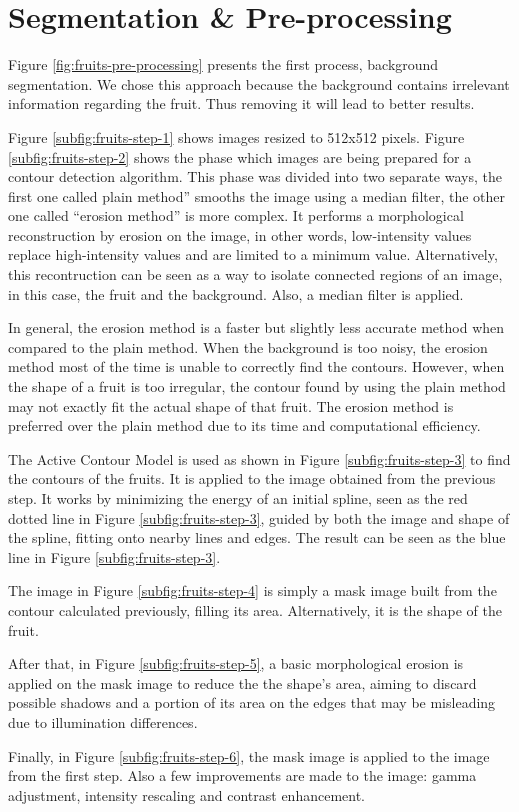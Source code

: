 \documentclass[../main.tex]{subfile}
\begin{document}
\section{Segmentation \& Pre-processing} \label{sec:segmentation-&-preprocesing}
    

    Figure \ref{fig:fruits-pre-processing} presents the first process, background segmentation. We chose this approach because the background contains irrelevant information regarding the fruit. Thus removing it will lead to better results.
    
    Figure \ref{subfig:fruits-step-1} shows images resized to 512x512 pixels. Figure \ref{subfig:fruits-step-2} shows the phase which  images are being prepared for a contour detection algorithm.
    This phase was divided into two separate ways, the first one called plain method'' smooths the image using a median filter, the other one called ``erosion method'' is more complex.
    It performs a morphological reconstruction by erosion on the image, in other words, low-intensity values replace high-intensity values and are limited to a minimum value. Alternatively, this recontruction can be seen as a way to isolate connected regions of an image, in this case, the fruit and the background. Also, a median filter is applied.
    
    In general, the erosion method is a faster but slightly less accurate method when compared to the plain method. When the background is too noisy, the erosion method most of the time is unable to correctly find the contours. However, when the shape of a fruit is too irregular, the contour found by using the plain method may not exactly fit the actual shape of that fruit. The erosion method is preferred over the plain method due to its time and computational efficiency.
    
    The Active Contour Model \cite{III-item1} is used as shown in Figure \ref{subfig:fruits-step-3} to find the contours of the fruits. It is applied to the image obtained from the previous step. It works by minimizing the energy of an initial spline, seen as the red dotted line in Figure \ref{subfig:fruits-step-3}, guided by both the image and shape of the spline, fitting onto nearby lines and edges. The result can be seen as the blue line in Figure \ref{subfig:fruits-step-3}.
    
    The image in Figure \ref{subfig:fruits-step-4} is simply a mask image built from the contour calculated previously, filling its area. Alternatively, it is the shape of the fruit.
    
    After that, in Figure \ref{subfig:fruits-step-5}, a basic morphological erosion is applied on the mask image to reduce the the shape's area, aiming to discard possible shadows and a portion of its area on the edges that may be misleading due to illumination differences.
    
    Finally, in Figure \ref{subfig:fruits-step-6}, the mask image is applied to the image from the first step. Also a few improvements are made to the image: gamma adjustment, intensity rescaling and contrast enhancement.
\end{document}
